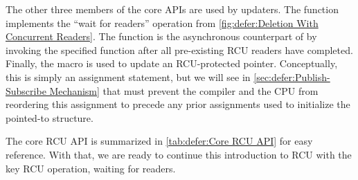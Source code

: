 The other three members of the core APIs are used by updaters.
The  function implements the ``wait for readers''
operation from \cref{fig:defer:Deletion With Concurrent Readers}.
The  function is the asynchronous counterpart of
 by invoking the specified function after
all pre-existing RCU readers have completed.
Finally, the  macro is used to update an
RCU-protected pointer.
Conceptually, this is simply an assignment statement, but we will
see in
\cref{sec:defer:Publish-Subscribe Mechanism}
that  must prevent the compiler and the CPU
from reordering this assignment to precede any prior assignments used
to initialize the pointed-to structure.

\begin{table}
\renewcommand*{\arraystretch}{1.25}
\small
\centering
{}
\caption{Core RCU API}
\label{tab:defer:Core RCU API}
\end{table}

\QuickQuizEnd

The core RCU API is summarized in \cref{tab:defer:Core RCU API} for
easy reference.
With that, we are ready to continue this introduction to RCU with
the key RCU operation, waiting for readers.

